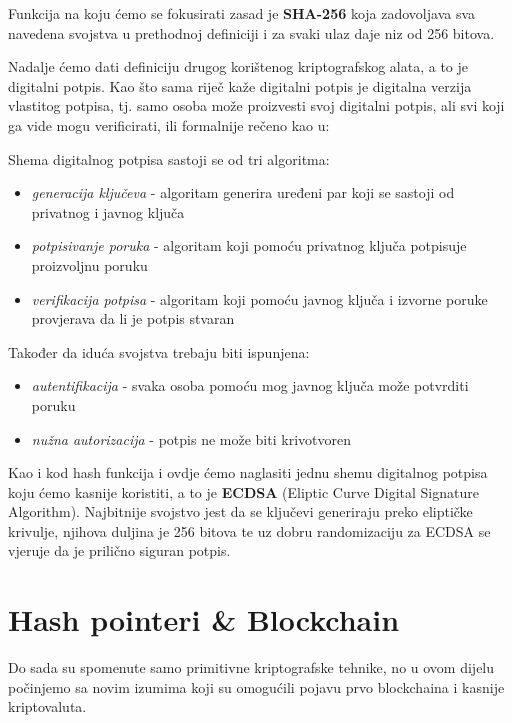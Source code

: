\documentclass[a4paper,oneside,12pt]{memoir} %
\begin{document}
Funkcija na koju ćemo se fokusirati zasad je \textbf{SHA-256} koja zadovoljava sva navedena svojstva u prethodnoj definiciji i za svaki ulaz daje niz od 256 bitova.

Nadalje ćemo dati definiciju drugog korištenog kriptografskog alata, a to je digitalni potpis. Kao što sama riječ kaže digitalni potpis je digitalna verzija vlastitog potpisa, tj. samo osoba može proizvesti svoj digitalni potpis, ali svi koji ga vide mogu verificirati, ili formalnije rečeno kao u\cite{bitcoincrypto}:

\begin{definicija}
Shema digitalnog potpisa sastoji se od tri algoritma: 
\begin{itemize}
    \item \textit{generacija ključeva} - algoritam generira uređeni par koji se sastoji od privatnog i javnog ključa
    \item \textit{potpisivanje poruka} - algoritam koji pomoću privatnog ključa potpisuje proizvoljnu poruku
    \item \textit{verifikacija potpisa} - algoritam koji pomoću javnog ključa i izvorne poruke provjerava da li je potpis stvaran
\end{itemize}
Također da iduća svojstva trebaju biti ispunjena:
\begin{itemize}
    \item \textit{autentifikacija} - svaka osoba pomoću mog javnog ključa može potvrditi poruku
    \item \textit{nužna autorizacija} - potpis ne može biti krivotvoren
\end{itemize}
\end{definicija}

Kao i kod hash funkcija i ovdje ćemo naglasiti jednu shemu digitalnog potpisa koju ćemo kasnije koristiti, a to je \textbf{ECDSA} (Eliptic Curve Digital Signature Algorithm). Najbitnije svojstvo jest da se ključevi generiraju preko eliptičke krivulje, njihova duljina je 256 bitova te uz dobru randomizaciju za ECDSA se vjeruje da je prilično siguran potpis.

\section{Hash pointeri \& Blockchain}

Do sada su spomenute samo primitivne kriptografske tehnike, no u ovom dijelu počinjemo sa novim izumima koji su omogućili pojavu prvo blockchaina i kasnije kriptovaluta. 
\end{document}
